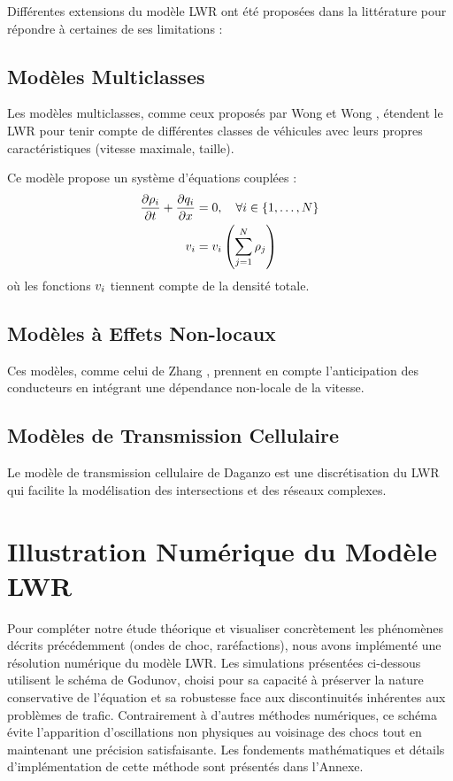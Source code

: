 Différentes extensions du modèle LWR ont été proposées dans la littérature pour répondre à certaines de ses limitations :

\subsection{Modèles Multiclasses}
\label{subsec:multiclasses}

Les modèles multiclasses, comme ceux proposés par Wong et Wong \cite{wong2002multi}, étendent le LWR pour tenir compte de différentes classes de véhicules avec leurs propres caractéristiques (vitesse maximale, taille).

\begin{example}
Ce modèle propose un système d'équations couplées :
\begin{align}
\frac{\partial \rho_{i}}{\partial t} + \frac{\partial q_{i}}{\partial x} &= 0, \quad \forall i \in \{1,\ldots,N\}\\
v_{i} &= v_{i}\left(\sum_{j=1}^{N} \rho_{j}\right)
\end{align}
où les fonctions $v_{i}$ tiennent compte de la densité totale.
\end{example}

\subsection{Modèles à Effets Non-locaux}
\label{subsec:non_local}

Ces modèles, comme celui de Zhang \cite{zhang2003non}, prennent en compte l'anticipation des conducteurs en intégrant une dépendance non-locale de la vitesse.

\subsection{Modèles de Transmission Cellulaire}
\label{subsec:cell_transmission}

Le modèle de transmission cellulaire de Daganzo \cite{daganzo1995cell} est une discrétisation du LWR qui facilite la modélisation des intersections et des réseaux complexes.

\section{Illustration Numérique du Modèle LWR}
\label{sec:illustration_numerique}

Pour compléter notre étude théorique et visualiser concrètement les phénomènes décrits précédemment (ondes de choc, raréfactions), nous avons implémenté une résolution numérique du modèle LWR. Les simulations présentées ci-dessous utilisent le schéma de Godunov, choisi pour sa capacité à préserver la nature conservative de l'équation et sa robustesse face aux discontinuités inhérentes aux problèmes de trafic. Contrairement à d'autres méthodes numériques, ce schéma évite l'apparition d'oscillations non physiques au voisinage des chocs tout en maintenant une précision satisfaisante. Les fondements mathématiques et détails d'implémentation de cette méthode sont présentés dans l'Annexe.
